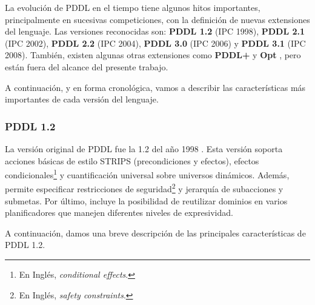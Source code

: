 La evoluci\'on de PDDL en el tiempo tiene algunos hitos importantes, principalmente
en sucesivas competiciones, con la definici\'on de nuevas extensiones del lenguaje.
Las versiones reconocidas son: {\bf PDDL 1.2} (IPC 1998), 
{\bf PDDL 2.1} (IPC 2002), {\bf PDDL 2.2} (IPC 2004), {\bf PDDL 3.0} (IPC 2006) y
{\bf PDDL 3.1} (IPC 2008). Tambi\'en, existen algunas otras extensiones como
{\bf PDDL+} \cite{gbraun:pddl+} y {\bf Opt} \cite{gbraun:opt}, pero est\'an fuera del alcance 
del presente trabajo.

A continuaci\'on, y en forma cronol\'ogica, vamos a describir las
caracter\'isticas m\'as importantes de cada versi\'on del lenguaje.

\subsubsection{PDDL 1.2}

La versi\'on original de PDDL fue la 1.2 del a\~{n}o 1998 \cite{gbraun:pddl12}.
Esta versi\'on soporta acciones b\'asicas de estilo STRIPS 
(precondiciones y efectos), efectos 
condicionales\footnote{En Ingl\'es, \emph{conditional effects}.}
y cuantificaci\'on universal sobre universos din\'amicos. 
Adem\'as, permite especificar restricciones de 
seguridad\footnote{En Ingl\'es, \emph{safety constraints}.}
y jerarqu\'ia de subacciones y submetas. Por \'ultimo, incluye
la posibilidad de reutilizar dominios en varios planificadores
que manejen diferentes niveles de expresividad.

A continuaci\'on, damos una breve descripci\'on de las principales
caracter\'isticas de PDDL 1.2.

